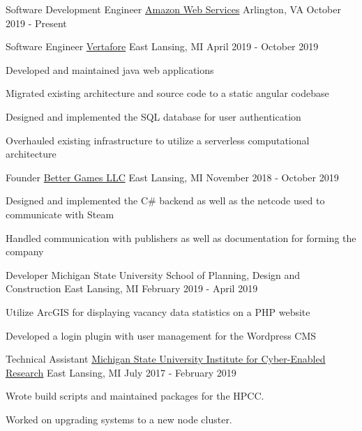
\begin{cventries}

  \cventry
    {Software Development Engineer} %
    {\href{https://aws.amazon.com}{Amazon Web Services}} %
    {Arlington, VA} %
    {October 2019 - Present} %
    {
      \begin{cvitems}
      \end{cvitems}
    }

  \cventry
    {Software Engineer}
    {\href{https://www.vertafore.com}{Vertafore}}
    {East Lansing, MI}
    {April 2019 - October 2019}
    {
      \begin{cvitems}
        \item {Developed and maintained java web applications}
        \item {Migrated existing architecture and source code to a static angular codebase}
        \item {Designed and implemented the SQL database for user authentication}
        \item {Overhauled existing infrastructure to utilize a serverless computational architecture}
      \end{cvitems}
    }

  \cventry
    {Founder}
    {\href{https://better-games.org}{Better Games LLC}}
    {East Lansing, MI}
    {November 2018 - October 2019}
    {
      \begin{cvitems}
        \item {Designed and implemented the C\# backend as well as the netcode used to communicate with Steam}
        \item {Handled communication with publishers as well as documentation for forming the company}
      \end{cvitems}
    }

  \cventry
  {Developer}
  {Michigan State University School of Planning, Design and Construction}
  {East Lansing, MI}
  {February 2019 - April 2019}
  {
    \begin{cvitems}
      \item {Utilize ArcGIS for displaying vacancy data statistics on a PHP website}
      \item {Developed a login plugin with user management for the Wordpress CMS}
    \end{cvitems}
  }

  \cventry
    {Technical Assistant}
    {\href{https://icer.msu.edu}{Michigan State University Institute for Cyber-Enabled Research}}
    {East Lansing, MI}
    {July 2017 - February 2019}
    {
      \begin{cvitems}
        \item {Wrote build scripts and maintained packages for the HPCC.}
        \item {Worked on upgrading systems to a new node cluster.}
      \end{cvitems}
    }


\end{cventries}
